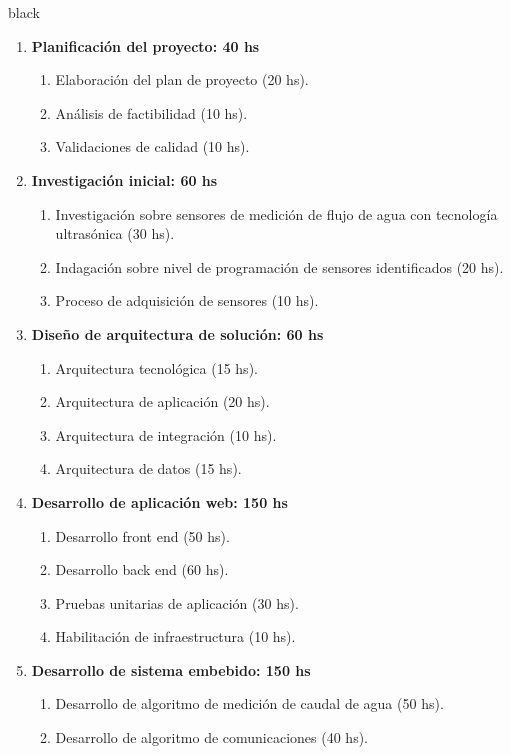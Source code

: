 \documentclass[
11pt, %
codirector, %
]{charter}
\begin{document}
\begin{consigna}{black}

\begin{enumerate}
\item \textbf{Planificación del proyecto: 40 hs}
	\begin{enumerate}
	\item Elaboración del plan de proyecto (20 hs).
	\item Análisis de factibilidad (10 hs).
	\item Validaciones de calidad (10 hs).
	\end{enumerate}
\item \textbf{Investigación inicial: 60 hs}
	\begin{enumerate}
	\item Investigación sobre sensores de medición de flujo de agua con tecnología ultrasónica (30 hs).
	\item Indagación sobre nivel de programación de sensores identificados (20 hs).
	\item Proceso de adquisición de sensores (10 hs).
	\end{enumerate}
\item \textbf{Diseño de arquitectura de solución: 60 hs}
	\begin{enumerate}
	\item Arquitectura tecnológica (15 hs).
	\item Arquitectura de aplicación (20 hs).
	\item Arquitectura de integración (10 hs).
	\item Arquitectura de datos (15 hs).
	\end{enumerate}
\item \textbf{Desarrollo de aplicación web: 150 hs}
	\begin{enumerate}
	\item Desarrollo front end (50 hs).
	\item Desarrollo back end (60 hs).
	\item Pruebas unitarias de aplicación (30 hs).
	\item Habilitación de infraestructura (10 hs).
	\end{enumerate}
\item \textbf{Desarrollo de sistema embebido: 150 hs}
	\begin{enumerate}
	\item Desarrollo de algoritmo de medición de caudal de agua (50 hs).
	\item Desarrollo de algoritmo de comunicaciones (40 hs).

\end{enumerate}
\end{enumerate}
\end{consigna}
\end{document}
